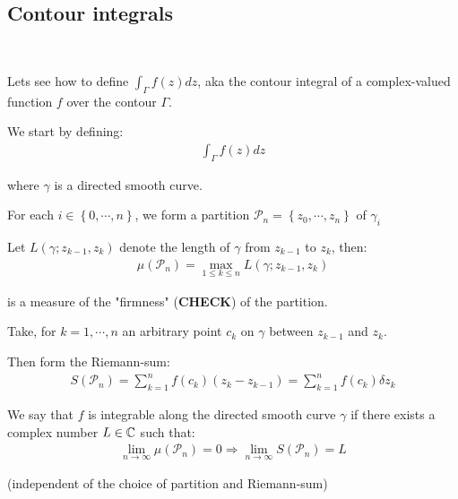 \subsection{Contour integrals}\hfill\\\par
\noindent Lets see how to define $\int_{\Gamma}f(z)dz$, aka the contour integral of a complex-valued function $f$ over the contour $\Gamma$.
\par\bigskip
\noindent We start by defining:
\begin{equation*}
  \begin{gathered}
    \int_{\Gamma}f(z)dz
  \end{gathered}
\end{equation*}\par
\noindent where $\gamma$ is a directed smooth curve.
\par\bigskip
\noindent For each $i\in\left\{0,\cdots,n\right\}$, we form a partition $\mathcal{P}_n = \left\{z_0,\cdots,z_n\right\}$ of $\gamma_i$\par
\noindent Let $L(\gamma; z_{k-1}, z_k)$ denote the length of $\gamma$ from $z_{k-1}$ to $z_k$, then:
\begin{equation*}
  \begin{gathered}
    \mu(\mathcal{P}_n) = \max_{1\leq k\leq n} L(\gamma;z_{k-1},z_k)
  \end{gathered}
\end{equation*}\par
\noindent is a measure of the "firmness" (\textbf{CHECK}) of the partition.
\par\bigskip
\noindent Take, for $k = 1,\cdots,n$ an arbitrary point $c_k$ on $\gamma$ between $z_{k-1}$ and $z_k$.\par
\noindent Then form the Riemann-sum:
\begin{equation*}
  \begin{gathered}
    S(\mathcal{P}_n) = \sum_{k=1}^{n}f(c_k)(z_k-z_{k-1}) = \sum_{k=1}^{n}f(c_k)\delta z_k
  \end{gathered}
\end{equation*}
\par\bigskip
\begin{theo}[]{}
  We say that $f$ is integrable along the directed smooth curve $\gamma$ if there exists a complex number $L\in\mathbb{C}$ such that:
  \begin{equation*}
    \begin{gathered}
      \lim_{n\to\infty}\mu(\mathcal{P}_n) = 0\Rightarrow \lim_{n\to\infty}S(\mathcal{P}_n) = L
    \end{gathered}
  \end{equation*}
  \par\bigskip
  \noindent (independent of the choice of partition and Riemann-sum)
\end{theo}
